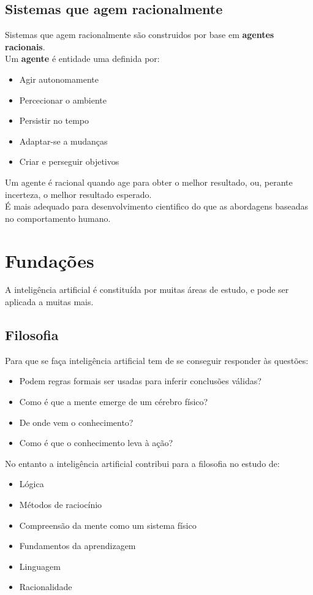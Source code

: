 \documentclass[]{report}
\begin{document}
\subsection{Sistemas que agem racionalmente}
Sistemas que agem racionalmente são construidos por base em \textbf{agentes racionais}.\\
Um \textbf{agente} é entidade uma definida por:
\begin{itemize}
\item Agir autonomamente
\item Percecionar o ambiente
\item Persistir no tempo
\item Adaptar-se a mudanças
\item Criar e perseguir objetivos
\end{itemize}
Um agente é racional quando age para obter o melhor resultado, ou, perante incerteza, o melhor resultado esperado.\\
É mais adequado para desenvolvimento cientifico do que as abordagens baseadas no comportamento humano.

\section{Fundações}
A inteligência artificial é constituída por muitas áreas de estudo, e pode ser aplicada a muitas mais. 
\subsection{Filosofia}
Para que se faça inteligência artificial tem de se conseguir responder às questões:
\begin{itemize}
\item Podem regras formais ser usadas para inferir conclusões válidas?
\item Como é que a mente emerge de um cérebro físico?
\item De onde vem o conhecimento?
\item Como é que o conhecimento leva à ação?
\end{itemize}
No entanto a inteligência artificial contribui para a filosofia no estudo de:
\begin{itemize}
\item Lógica
\item Métodos de raciocínio
\item Compreensão da mente como um sistema físico
\item Fundamentos da aprendizagem
\item Linguagem
\item Racionalidade
\end{itemize}
\end{document}
